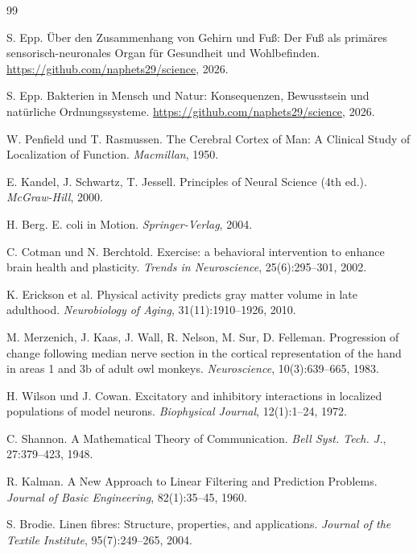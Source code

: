 \documentclass[a4paper,12pt]{article}
\theoremstyle{definition}
\begin{document}
\begin{thebibliography}{99}

    S. Epp.
    Über den Zusammenhang von Gehirn und Fuß: Der Fuß als primäres sensorisch-neuronales Organ für Gesundheit und Wohlbefinden.
    \url{https://github.com/naphets29/science}, 2026.

    S. Epp.
    Bakterien in Mensch und Natur: Konsequenzen, Bewusstsein und natürliche Ordnungssysteme.
    \url{https://github.com/naphets29/science}, 2026.

    W. Penfield und T. Rasmussen.
    The Cerebral Cortex of Man: A Clinical Study of Localization of Function.
    \textit{Macmillan}, 1950.

    E. Kandel, J. Schwartz, T. Jessell.
    Principles of Neural Science (4th ed.).
    \textit{McGraw-Hill}, 2000.

    H. Berg.
    E. coli in Motion.
    \textit{Springer-Verlag}, 2004.

    C. Cotman und N. Berchtold.
    Exercise: a behavioral intervention to enhance brain health and plasticity.
    \textit{Trends in Neuroscience}, 25(6):295--301, 2002.

    K. Erickson et al.
    Physical activity predicts gray matter volume in late adulthood.
    \textit{Neurobiology of Aging}, 31(11):1910--1926, 2010.

    M. Merzenich, J. Kaas, J. Wall, R. Nelson, M. Sur, D. Felleman.
    Progression of change following median nerve section in the cortical representation of the hand in areas 1 and 3b of adult owl monkeys.
    \textit{Neuroscience}, 10(3):639--665, 1983.

    H. Wilson und J. Cowan.
    Excitatory and inhibitory interactions in localized populations of model neurons.
    \textit{Biophysical Journal}, 12(1):1--24, 1972.

    C. Shannon.
    A Mathematical Theory of Communication.
    \textit{Bell Syst. Tech. J.}, 27:379--423, 1948.

    R. Kalman.
    A New Approach to Linear Filtering and Prediction Problems.
    \textit{Journal of Basic Engineering}, 82(1):35--45, 1960.

    S. Brodie.
    Linen fibres: Structure, properties, and applications.
    \textit{Journal of the Textile Institute}, 95(7):249--265, 2004.


\end{thebibliography}
\end{document}
